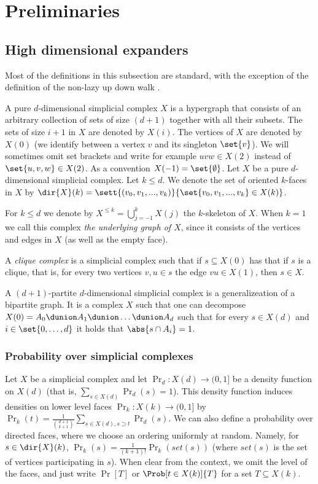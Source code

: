 \section{Preliminaries} \label{sec:preliminaries}
\subsection{High dimensional expanders}
Most of the definitions in this subsection are standard, with the exception of the definition of the non-lazy up down walk .

A pure \(d\)-dimensional simplicial complex \(X\) is a hypergraph that consists of an arbitrary collection of sets of size \((d+1)\) together with all their subsets. The sets of size \(i+1\) in \(X\) are denoted by \(X(i)\). The vertices of \(X\) are denoted by \(X(0)\) (we identify between a vertex \(v\) and its singleton \(\set{v}\)). We will sometimes omit set brackets and write for example \(uvw\in X(2)\) instead of \(\set{u,v,w}\in X(2)\). As a convention \(X(-1) = \set{\emptyset}\).
%
Let \(X\) be a pure \(d\)-dimensional simplicial complex. Let \(k \leq d\). We denote the set of oriented \(k\)-faces in \(X\) by \(\dir{X}(k) = \sett{(v_0,v_1,...,v_k)}{\set{v_0,v_1,...,v_k} \in X(k)}\).

For \(k \leq d\) we denote by \(X^{\leq k} = \bigcup_{j=-1}^k X(j)\) the \(k\)-skeleton of \(X\). When \(k=1\) we call this complex \emph{the underlying graph of \(X\)}, since it consists of the vertices and edges in \(X\) (as well as the empty face).

A \emph{clique complex} is a simplicial complex such that if \(s \subseteq X(0)\) has that if \(s\) is a clique, that is, for every two vertices \(v,u \in s\) the edge \(vu \in X(1)\), then \(s \in X\).

A \((d+1)\)-partite \(d\)-dimensional simplicial complex is a generalizeation of a bipartite graph. It is a complex \(X\) such that one can decompose \(X(0) = A_0 \dunion A_1 \dunion \dots \dunion A_d\) such that for every \(s \in X(d)\) and \(i \in \set{0,\ldots,d}\) it holds that \(\abs{s \cap A_i} = 1\).

\subsubsection*{Probability over simplicial complexes}
Let \(X\) be a simplicial complex and let \(\Pr_d:X(d)\to (0,1]\) be a density function on \(X(d)\) (that is, \(\sum_{s \in X(d)}\Pr_d(s)=1\)). This density function induces densities on lower level faces \(\Pr_k:X(k)\to (0,1]\) by \(\Pr_k(t) = \frac{1}{\binom{d+1}{k+1}}\sum_{s \in X(d),s \supset t} \Pr_d(s)\). We can also define a probability over directed faces, where we choose an ordering uniformly at random. Namely, for \(s\in \dir{X}(k)\), \(\Pr_k(s) = \frac{1}{(k+1)!}\Pr_k(set(s))\) (where \(set(s)\) is the set of vertices participating in \(s\)). When clear from the context, we omit the level of the faces, and just write \(\Pr[T]\) or \(\Prob[t \in X(k)]{T}\) for a set \(T \subseteq X(k)\).

